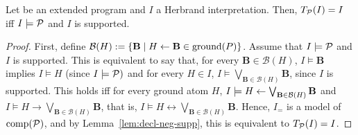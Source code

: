 \begin{lem}
    Let \prog be an extended program and \(I\) a Herbrand interpretation. Then, \(T_\mathcal{P}(I) = I\) iff \(I \models \mathcal{P}\) and \(I\) is supported.
\end{lem}
\begin{proof}
    First, define \(\mathcal{B}(H) := \lbrace \mathbf{B} \mid H \leftarrow \mathbf{B} \in \operatorname{ground}(P) \rbrace\).
    Assume that \(I \models \mathcal{P}\) and \(I\) is supported.
    This is equivalent to say that, for every \(\mathbf{B} \in \mathcal{B}(H)\), \(I \models \mathbf{B}\) implies \(I \models H\) (since \(I \models \mathcal{P})\) and for every \(H \in I\), \(I \models \bigvee_{\mathbf{B} \in \mathcal{B}(H)} \mathbf{B}\), since \(I\) is supported.
    This holds iff for every ground atom \(H\), \(I \models H \leftarrow \bigvee_{\mathbf{B} \in \mathcal{B}(H)} \mathbf{B}\) and \(I \models H \to \bigvee_{\mathbf{B} \in \mathcal{B}(H)} \mathbf{B}\), that is, \(I \models H \leftrightarrow \bigvee_{\mathbf{B} \in \mathcal{B}(H)} \mathbf{B}\).
    Hence, \(I_=\) is a model of \(\operatorname{comp}(\mathcal{P})\), and by Lemma~\ref{lem:decl-neg-supp}, this is equivalent to \(T_\mathcal{P}(I) = I\).
\end{proof}